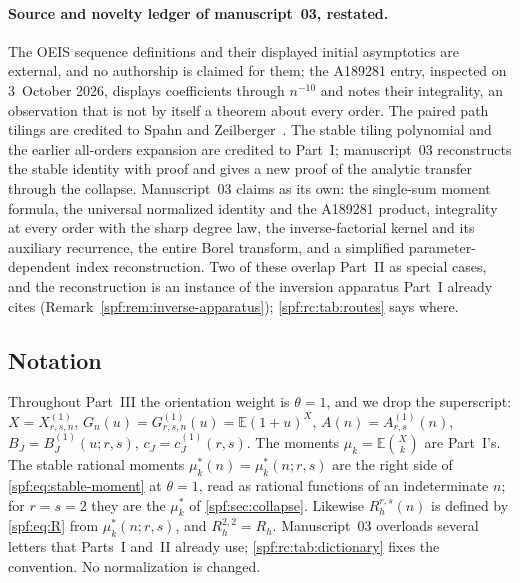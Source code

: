 \documentclass[11pt]{article}
\numberwithin{equation}{section}
\theoremstyle{definition}
\theoremstyle{remark}
\theoremstyle{definition}
\newcommand{\E}{\mathbb E}
\begin{document}
\paragraph{Source and novelty ledger of manuscript~03, restated.} The OEIS
sequence definitions and their displayed initial asymptotics are external,
and no authorship is claimed for them; the A189281 entry, inspected on
3~October 2026, displays coefficients through $n^{-10}$ and notes their
integrality, an observation that is not by itself a theorem about every
order. The paired path tilings are
credited to Spahn and Zeilberger~\cite{spahn}. The stable tiling polynomial
and the earlier all-orders expansion are credited to Part~I; manuscript~03
reconstructs the stable identity with proof and gives a new proof of the
analytic transfer through the collapse. Manuscript~03 claims as its own:
the single-sum moment formula, the universal normalized identity and the
A189281 product, integrality at every order with the sharp degree law, the
inverse-factorial kernel and its auxiliary recurrence, the entire Borel
transform, and a simplified parameter-dependent index reconstruction. Two of
these overlap Part~II as special cases, and the reconstruction is an
instance of the inversion apparatus Part~I already cites
(Remark~\ref{spf:rem:inverse-apparatus}); \cref{spf:rc:tab:routes} says where.

\subsection{Notation}
\label{spf:rc:sec:notation}

Throughout Part~III the orientation weight is $\theta=1$, and we drop the
superscript: $X=X^{(1)}_{r,s,n}$, $G_n(u)=G^{(1)}_{r,s,n}(u)=\E(1+u)^X$,
$A(n)=A^{(1)}_{r,s}(n)$, $B_J=B_J^{(1)}(u;r,s)$, $c_J=c_J^{(1)}(r,s)$. The
moments $\mu_k=\E\binom Xk$ are Part~I's. The stable rational moments
$\mu_k^*(n)=\mu_k^*(n;r,s)$ are the right side of \eqref{spf:eq:stable-moment}
at $\theta=1$, read as rational functions of an indeterminate $n$; for
$r=s=2$ they are the $\mu_k^*$ of \cref{spf:sec:collapse}. Likewise
$R_h^{r,s}(n)$ is defined by \eqref{spf:eq:R} from $\mu_k^*(n;r,s)$, and
$R_h^{2,2}=R_h$. Manuscript~03 overloads several letters that Parts~I and~II
already use; \cref{spf:rc:tab:dictionary} fixes the convention. No
normalization is changed.
\end{document}
